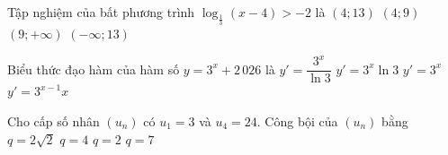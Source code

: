 \caulc
\begin{ex}%
	Tập nghiệm của bất phương trình $\log_{\frac{1}{3}}(x-4)>-2$ là
	\choice
	{\True $(4;13)$}
	{$(4;9)$}
	{$(9;+\infty)$}
	{$(-\infty;13)$}
\end{ex}

\begin{ex}%
	Biểu thức đạo hàm của hàm số $y=3^x+2\,026$ là
	\choice
	{$y'=\dfrac{3^x}{\ln 3}$}
	{\True $y'=3^x\ln 3$}
	{$y'=3^x$}
	{$y'=3^{x-1}x$}
\end{ex}

\begin{ex}%
	Cho cấp số nhân $(u_n)$ có $u_1=3$ và $u_4=24$. Công bội của $\left(u_n\right)$ bằng
	\choice
	{$q=2\sqrt{2}$}
	{$q=4$}
	{\True $q=2$}
	{$q=7$}
\end{ex}


